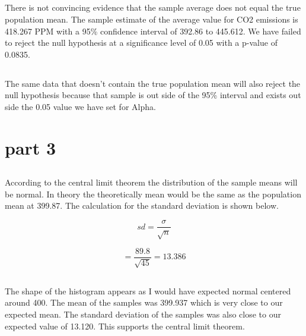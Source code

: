 \documentclass[letterpaper, onecolumn,10pt]{IEEEtran}
\begin{document}
            \subsection{}
                There is not convincing evidence that the sample average does not equal the true population mean. The sample estimate of the average value for CO2 emissions is 418.267 PPM with a 95\% confidence interval of 392.86 to 445.612. We have failed to reject the null hypothesis at a significance level of 0.05 with a p-value of 0.0835.\\
                
            \subsection{}
                The same data that doesn't contain the true population mean will also reject the null hypothesis because that sample is out side of the 95\% interval and exists out side the 0.05 value we have set for Alpha.\\
                
        
        \section{part 3}
            \subsection{}
                According to the central limit theorem the distribution of the sample means will be normal. In theory the theoretically mean would be the same as the population mean at 399.87. The calculation for the standard deviation is shown below.
                
                \[
                    sd = \dfrac{\sigma}{\sqrt{n}}
                \]
                
                \[
                    = \dfrac{89.8}{\sqrt{45}} = 13.386
                \]
            \subsection{}
                The shape of the histogram appears as I would have expected normal centered around 400. The mean of the samples was 399.937 which is very close to our expected mean. The standard deviation of the samples was also close to our expected value of 13.120. This supports the central limit theorem.\\
                
\end{document}
